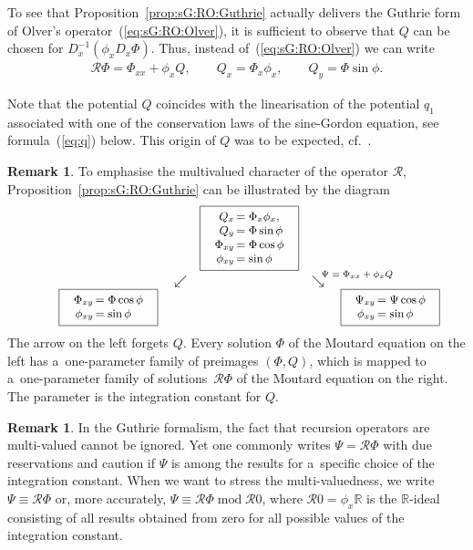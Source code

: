 \documentclass[pdftex]{sigma}
\makeatletter
\def\eqref#1{{\rm(\ref{#1})}}
\def\RR{{\mathbb R}}
\def\RO{{\mathcal R}}
\def\fpb#1#2{\fbox{\parbox{#2}{\small\centering #1}}}
\def\fpa#1#2{\fpb{$\begin{array}{r@{\,}l} #1 \end{array}$}{#2}}
\numberwithin{equation}{section}
\theoremstyle{definition}
\newtheorem{Remark}[Theorem]{Remark}
\makeatother
\begin{document}
To see that Proposition~\ref{prop:sG:RO:Guthrie} actually delivers
the Guthrie form of Olver's operator~\eqref{eq:sG:RO:Olver},
it is sufficient to observe that $Q$ can be chosen for
$D_x^{-1} (\phi_x D_x \Phi)$.
Thus, instead of~\eqref{eq:sG:RO:Olver} we can write
\begin{gather}
\label{eq:sG:RO:Guthrie}
\RO\Phi = \Phi_{xx} + \phi_x Q,
\qquad
Q_x = \Phi_x \phi_x,
\qquad
Q_y = \Phi \sin \phi.
\end{gather}



Note that the potential $Q$ coincides
with the linearisation of the potential $q_1$ associated with one of the
conservation laws of the
sine-Gordon equation, see formula~\eqref{eq:q} below.
This origin of $Q$ was to be expected, cf.\ \hbox{\cite[Section~4]{MM-alro}}.




\begin{Remark}
To emphasise the multivalued character of the operator $\RO$,
Proposition~\ref{prop:sG:RO:Guthrie} can be illustrated by the diagram
\[
\qquad\begin{array}{ccccc}
&&\fpa{Q_x &= \Phi_x \phi_x,
\\
Q_y &= \Phi \sin \phi
\\
\Phi_{xy} &= \Phi \cos\phi
\\
\phi_{xy} &= \sin\phi}{2.5cm}
\\
& \raise1ex\llap{\scriptsize} \swarrow && \searrow
\raise1.4ex\rlap{\hglue-1.2ex\scriptsize $\Psi = \Phi_{xx} + \phi_x Q$}
\\
\fpa{\Phi_{xy} &= \Phi \cos\phi
\\
\phi_{xy} &= \sin\phi}{2.5cm}
&&&&\fpa{\Psi_{xy} &= \Psi \cos\phi
\\
\phi_{xy} &= \sin\phi}{2.5cm}
\end{array}
\]
The arrow on the left forgets $Q$.
Every solution $\Phi $ of the Moutard equation on the left
has a~one-parameter family of preimages $(\Phi,Q)$,
which is mapped to a~one-parameter family of solutions~$\RO\Phi$
of the Moutard equation on the right.
The parameter is the integration constant for $Q$.
\end{Remark}


\begin{Remark}
\label{rem:multi}
In the Guthrie formalism,
the fact that recursion operators are multi-valued cannot be ignored.
Yet one commonly writes $\Psi = \RO\Phi$ with due reservations
and caution if $\Psi$ is among
the results for a~specific choice of the integration constant.
When we want to stress the multi-valuedness, we write
$\Psi \equiv \RO\Phi$ or,
more accurately, $\Psi \equiv \RO\Phi \operatorname{mod} \RO 0$,
where $\RO 0 = \phi_x \RR$
is the $\RR$-ideal consisting of all results obtained from
zero for all possible values of the integration constant.
\end{Remark}
\end{document}
